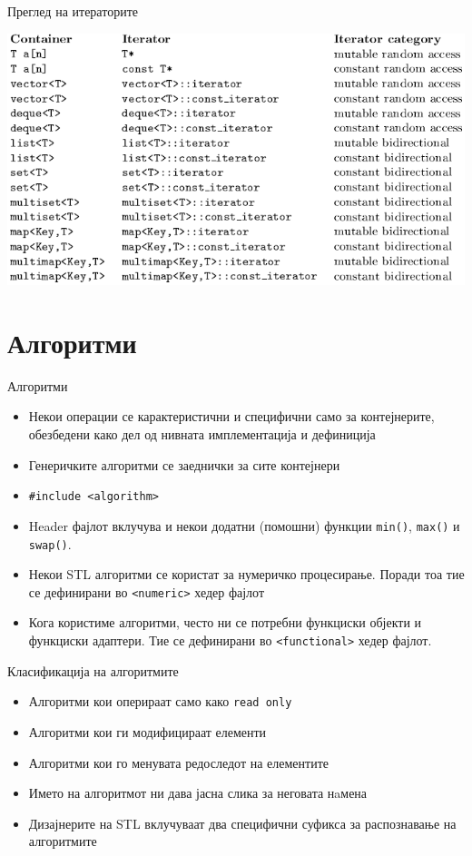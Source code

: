 \begin{frame}{Преглед на итераторите}
\begin{center}
\includegraphics[width=\textwidth]{images/overview}
\end{center}
\end{frame}

\section{Алгоритми}

\begin{frame}{Алгоритми}
\begin{itemize}
  \item Некои операции се карактеристични и специфични само за контејнерите,
  обезбедени како дел од нивната имплементација и дефиниција
  \item Генеричките алгоритми се заеднички за сите контејнери
  \item \texttt{\#include <algorithm>}
  \item Header фајлот вклучува и некои додатни (помошни) функции \texttt{min()}, \texttt{max()} и
  \texttt{swap()}.
  \item Некои STL алгоритми се користат за нумеричко процесирање. Поради тоа тие
  се дефинирани во \texttt{<numeric>} хедер фајлот
  \item Кога користиме алгоритми, често ни се потребни функциски објекти и
  функциски адаптери. Тие се дефинирани во \texttt{<functional>} хедер фајлот.
\end{itemize}
\end{frame}

\begin{frame}{Класификација на алгоритмите}
\begin{itemize}
  \item Алгоритми кои оперираат само како \texttt{read only}
  \item Алгоритми кои ги модифицираат елементи
  \item Алгоритми кои го менувата редоследот на елементите
  \item Името на алгоритмот ни дава јасна слика за неговата нaмена
  \item Дизајнерите на STL вклучуваат два специфични суфикса за распознавање на алгоритмите
\end{itemize}
\end{frame}

